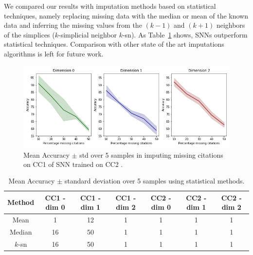 We compared our results with imputation methods based on statistical techniques, namely replacing missing data with the median or mean of the known data and inferring the missing values from the $(k-1)$ and $(k+1)$ neighbors of the simplices ($k$-simplicial neighbor $k$-sn). As Table~\ref{table:comparison-SNN} shows, SNNs outperform statistical techniques. Comparison with other state of the art imputations algorithms is left for future work.
\begin{figure}[htbp]
  \centering
\includegraphics[scale=0.35]{./figures/accuracy_network1_pretrained.png}
  \caption{ Mean Accuracy $\pm$ std over 5 samples in imputing missing citations on CC1 of SNN trained on CC2 . } \label{fig:transfer-learning}
\end{figure}

\begin{table}[htbp]
  \centering
  \scriptsize{
  \begin{tabular}{c|cccccc}
    \cmidrule(r){1-7}
    Method   & CC1 - dim 0   & CC1 - dim 1   & CC1 - dim 2   & CC2 - dim 0  & CC2 - dim 1  & CC2 - dim 2 \\
    \midrule
    Mean & 1  & 12 & 1  & 1 & 1  & 1\\
    Median & 16 & 50 & 1  & 1& 1  & 1\\
    $k$-sn & 16 & 50& 1  & 1& 1  & 1 \\
    \bottomrule
  \end{tabular}}
  \caption{%
 Mean Accuracy $\pm$ standard deviation over 5 samples using statistical methods. 
  }\label{table:comparison-SNN}
\end{table}%
